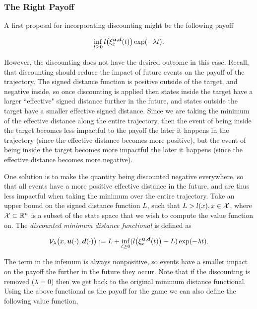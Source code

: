 \documentclass[letterpaper, 10 pt, conference]{ieeeconf}
\begin{document}
\subsubsection{The Right Payoff}

A first proposal for incorporating discounting might be the following payoff

\begin{equation}\label{eq:V}
\inf_{t\ge 0}l\big(\xi_{x}^{\bm{u},\bm{d}}(t)\big)\exp(-\lambda  t).
\end{equation}

However, the discounting does not have the desired outcome in this case. Recall, that discounting should reduce the impact of future events on the payoff of the trajectory. The signed distance function is positive outside of the target, and negative inside, so once discounting is applied then states inside the target have a larger ``effective" signed distance further in the future, and states outside the target have a smaller effective signed distance. Since we are taking the minimum of the effective distance along the entire trajectory, then the event of being inside the target becomes less impactful to the payoff the later it happens in the trajectory (since the effective distance becomes more positive), but the event of being inside the target becomes more impactful the later it happens (since the effective distance becomes more negative).

One solution is to make the quantity being discounted negative everywhere, so that all events have a more positive effective distance in the future, and are thus less impactful when taking the minimum over the entire trajectory. Take an upper bound on the signed distance function $L$, such that $L>l(x), x \in \mathcal{X} $, where $\mathcal{X} \subset \mathbb{R}^n$ is a subset of the state space that we wish to compute the value function on. The \emph{discounted minimum distance functional} is defined as 

\begin{equation}\label{eq:V_lambda}
\mathcal{V}_{\lambda}\big(x,\bm{u}(\cdot),\bm{d}(\cdot)\big) := L + \inf_{t\ge 0}(l\big(\xi_{x}^{\bm{u},\bm{d}}(t)\big)-L)\exp(-\lambda  t).
\end{equation}

The term in the infemum is always nonpositive, so events have a smaller impact on the payoff the further in the future they occur. Note that if the discounting is removed ($\lambda =0$) then we get back to the original minimum distance functional. Using the above functional as the payoff for the game we can also define the following value function,
\end{document}
